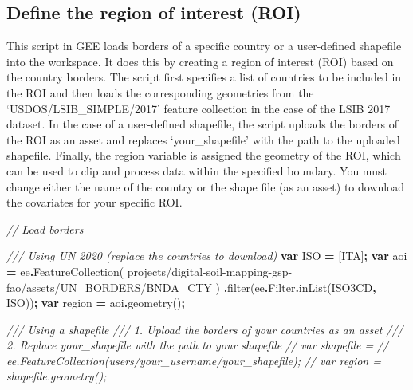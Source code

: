 \documentclass[
  10pt,
  b5paper,
  oneside]{book}
\newenvironment{Shaded}{\begin{snugshade}}{\end{snugshade}}
\newcommand{\AttributeTok}[1]{\textcolor[rgb]{0.77,0.63,0.00}{#1}}
\newcommand{\CommentTok}[1]{\textcolor[rgb]{0.56,0.35,0.01}{\textit{#1}}}
\newcommand{\FunctionTok}[1]{\textcolor[rgb]{0.00,0.00,0.00}{#1}}
\newcommand{\KeywordTok}[1]{\textcolor[rgb]{0.13,0.29,0.53}{\textbf{#1}}}
\newcommand{\NormalTok}[1]{#1}
\newcommand{\OperatorTok}[1]{\textcolor[rgb]{0.81,0.36,0.00}{\textbf{#1}}}
\newcommand{\StringTok}[1]{\textcolor[rgb]{0.31,0.60,0.02}{#1}}
\begin{document}
\hypertarget{define-the-region-of-interest-roi}{%
\subsection{Define the region of interest (ROI)}\label{define-the-region-of-interest-roi}}

This script in GEE loads borders of a specific country or a user-defined shapefile into the workspace. It does this by creating a region of interest (ROI) based on the country borders. The script first specifies a list of countries to be included in the ROI and then loads the corresponding geometries from the `USDOS/LSIB\_SIMPLE/2017' feature collection in the case of the LSIB 2017 dataset. In the case of a user-defined shapefile, the script uploads the borders of the ROI as an asset and replaces `your\_shapefile' with the path to the uploaded shapefile. Finally, the region variable is assigned the geometry of the ROI, which can be used to clip and process data within the specified boundary. You must change either the name of the country or the shape file (as an asset) to download the covariates for your specific ROI.

\begin{Shaded}
\begin{Highlighting}[]
\CommentTok{// Load borders }

\CommentTok{/// Using UN 2020 (replace the countries to download)}
\KeywordTok{var}\NormalTok{ ISO }\OperatorTok{=}\NormalTok{ [}\StringTok{\textquotesingle{}ITA\textquotesingle{}}\NormalTok{]}\OperatorTok{;}
\KeywordTok{var}\NormalTok{ aoi }\OperatorTok{=}
\NormalTok{ee}\OperatorTok{.}\FunctionTok{FeatureCollection}\NormalTok{(}
\StringTok{\textquotesingle{}projects/digital{-}soil{-}mapping{-}gsp{-}fao/assets/UN\_BORDERS/BNDA\_CTY\textquotesingle{}}
\NormalTok{)}
  \OperatorTok{.}\FunctionTok{filter}\NormalTok{(ee}\OperatorTok{.}\AttributeTok{Filter}\OperatorTok{.}\FunctionTok{inList}\NormalTok{(}\StringTok{\textquotesingle{}ISO3CD\textquotesingle{}}\OperatorTok{,}\NormalTok{ ISO))}\OperatorTok{;}
\KeywordTok{var}\NormalTok{ region }\OperatorTok{=}\NormalTok{ aoi}\OperatorTok{.}\FunctionTok{geometry}\NormalTok{()}\OperatorTok{;}

\CommentTok{/// Using a shapefile}
\CommentTok{/// 1. Upload the borders of your countries as an asset}
\CommentTok{/// 2. Replace \textquotesingle{}your\_shapefile\textquotesingle{} with the path to your shapefile}
\CommentTok{// var shapefile = }
\CommentTok{// ee.FeatureCollection(\textquotesingle{}users/your\_username/your\_shapefile\textquotesingle{});}
\CommentTok{// var region = shapefile.geometry();}
\end{Highlighting}
\end{Shaded}
\end{document}
